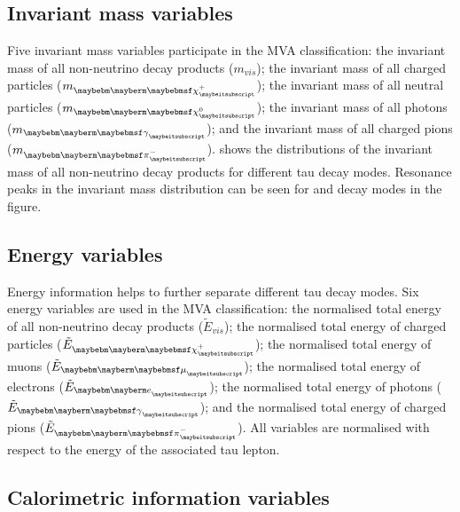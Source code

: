 \subsection{Invariant mass variables}

Five invariant mass variables participate in the MVA classification: the invariant mass of all non-neutrino decay products ($m_{vis}$); the invariant mass of all charged particles ($m_{\charge}$); the invariant mass of all neutral particles ($m_{\neutral}$); the invariant mass of all photons ($m_{\Pgg}$); and the invariant mass of all charged pions ($m_{\Pgpm}$).  shows the distributions of the invariant mass of all non-neutrino decay products for different tau decay modes. Resonance peaks in the invariant mass distribution can be seen for \Prho and \Pai decay modes in the figure.


\subsection{Energy variables}

Energy information helps to further separate different tau decay modes. Six energy variables are used in the MVA classification: the normalised total energy of all non-neutrino decay products ($\tilde{E}_{vis}$); the normalised total energy of charged particles ($\tilde{E}_{\charge}$); the normalised total energy of muons ($\tilde{E}_{\Pmu}$); the normalised total energy of electrons ($\tilde{E}_{\Pe}$); the normalised total energy of photons ($\tilde{E}_{\Pgg}$); and the normalised total energy of charged pions ($\tilde{E}_{\Pgpm}$). All variables are normalised with respect to the energy of the associated tau lepton.

\subsection{Calorimetric information variables}


